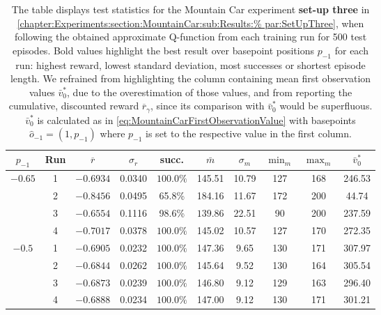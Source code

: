\documentclass[
    a4paper,
    11pt,
    bibliography=totoc,
    listof=totoc,      
    headinclude=true,
    cleardoublepage=empty,
]{scrbook}
\theoremstyle{plain}
\theoremstyle{definition}
\theoremstyle{remark}
\begin{document}
\begin{table}[htpb!]
    \centering
    \caption[%
        Test statistics in the Mountain Car experiment for training set-up
        three
    ]{%
        The table displays test statistics for the Mountain Car experiment 
        \textbf{set-up three} in
        \cref{chapter:Experiments:section:MountainCar:sub:Results:%
        par:SetUpThree}, when following the obtained approximate Q-function
        from each training run for 500 test episodes. Bold values highlight the
        best result over basepoint positions $p_{-1}$ for each run: highest
        reward, lowest standard deviation, most successes or shortest episode
        length. We refrained from highlighting the column containing mean 
        first observation values $\bar v^*_0$, due to the overestimation of 
        those values, and from reporting the cumulative, discounted reward 
        $\overline r_\gamma$, since its comparison with $\bar v_0^*$ would be 
        superfluous. $\bar v^*_0$ is calculated as in 
        \cref{eq:MountainCarFirstObservationValue} with basepoints 
        $\hat{o}_{-1} = (1, p_{-1})$ where $p_{-1}$ is set to the respective
        value in the first column.
    }
    \label{tab:MountainCarResultsStatisticsSetUpThree}
    
    \begin{tabular*}{\textwidth}{cc| @{\extracolsep{\fill}}  *{8}{c} }
        \toprule
        ${p_{-1}}$ & {Run} & 
            ${\overline{r}}$ & ${\sigma_r}$ & {succ.} & ${\bar{m}}$ & 
                ${\sigma_m}$ & ${\min_m}$ & ${\max_m}$ & 
                    ${\bar v^*_0}$ \\    
        \midrule
        \midrule
        
\multirow{4}{*}{${-0.65}$} 
& 1 & $-0.6934$ & 0.0340 & $\bm{100.0\%}$ & 145.51 & 10.79 & 127 & 168 & 246.53 \\
& 2 & $-0.8456$ & 0.0495 & 65.8\% & 184.16 & 11.67 & 172 & 200 & 44.74 \\
& 3 & $-0.6554$ & 0.1116 & 98.6\% & $\bm{139.86}$ & 22.51 & 90 & 200 & 237.59 \\
& 4 & $-0.7017$ & 0.0378 & $\bm{100.0\%}$ & 145.02 & 10.57 & 127 & 170 & 272.35 \\     

        \midrule
        
\multirow{4}{*}{${-0.5}$} 
& 1 & $-0.6905$ & 0.0232 & $\bm{100.0\%}$ & 147.36 & 9.65 & 130 & 171 & 307.97 \\
& 2 & $-0.6844$ & 0.0262 & $\bm{100.0\%}$ & 145.64 & 9.52 & 130 & 164 & 305.54 \\
& 3 & $-0.6873$ & 0.0239 & $\bm{100.0\%}$ & 146.80 & 9.12 & 129 & 163 & 296.40 \\
& 4 & $-0.6888$ & 0.0234 & $\bm{100.0\%}$ & 147.00 & 9.12 & 130 & 171 & 301.21 \\


\end{tabular*}
\end{table}
\end{document}
